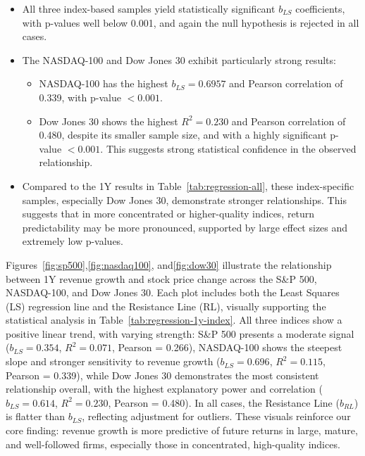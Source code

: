 \documentclass[11pt]{article}
\begin{document}
\begin{itemize}
    \item All three index-based samples yield statistically significant $b_{LS}$ coefficients, with p-values well below 0.001, and again the null hypothesis is rejected in all cases.

    \item The NASDAQ-100 and Dow Jones 30 exhibit particularly strong results:
        \begin{itemize}
            \item NASDAQ-100 has the highest $b_{LS} = 0.6957$ and Pearson correlation of 0.339, with p-value $<0.001$.
            \item Dow Jones 30 shows the highest $R^2 = 0.230$ and Pearson correlation of 0.480, despite its smaller sample size, and with a highly significant p-value $<0.001$. This suggests strong statistical confidence in the observed relationship.
        \end{itemize}

    \item Compared to the 1Y results in Table~\ref{tab:regression-all}, these index-specific samples, especially Dow Jones 30, demonstrate stronger relationships. This suggests that in more concentrated or higher-quality indices, return predictability may be more pronounced, supported by large effect sizes and extremely low p-values.
\end{itemize}

Figures~\ref{fig:sp500},\ref{fig:nasdaq100}, and\ref{fig:dow30} illustrate the relationship between 1Y revenue growth and stock price change across the S\&P 500, NASDAQ-100, and Dow Jones 30. Each plot includes both the Least Squares (LS) regression line and the Resistance Line (RL), visually supporting the statistical analysis in Table~\ref{tab:regression-1y-index}. All three indices show a positive linear trend, with varying strength: S\&P 500 presents a moderate signal ($b_{LS}=0.354$, $R^2=0.071$, Pearson = 0.266), NASDAQ-100 shows the steepest slope and stronger sensitivity to revenue growth ($b_{LS}=0.696$, $R^2=0.115$, Pearson = 0.339), while Dow Jones 30 demonstrates the most consistent relationship overall, with the highest explanatory power and correlation ($b_{LS}=0.614$, $R^2=0.230$, Pearson = 0.480). In all cases, the Resistance Line ($b_{RL}$) is flatter than $b_{LS}$, reflecting adjustment for outliers. These visuals reinforce our core finding: revenue growth is more predictive of future returns in large, mature, and well-followed firms, especially those in concentrated, high-quality indices.
\end{document}
